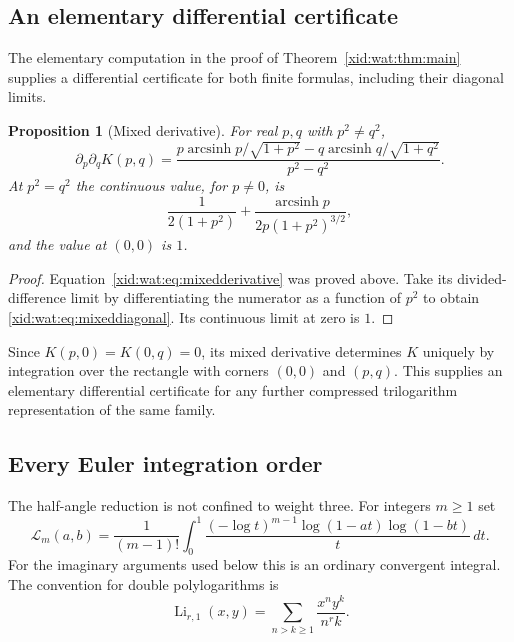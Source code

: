 \documentclass[11pt,a4paper]{article}
\numberwithin{equation}{section}
\newtheorem{proposition}[theorem]{Proposition}
\theoremstyle{definition}
\theoremstyle{remark}
\begin{document}
\subsection{An elementary differential certificate}

The elementary computation in the proof of
Theorem~\ref{xid:wat:thm:main} supplies a differential certificate for
both finite formulas, including their diagonal limits.

\begin{proposition}[Mixed derivative]
\label{xid:wat:prop:derivative}
For real $p,q$ with $p^2\ne q^2$,
\begin{equation}\label{xid:wat:eq:mixedderivative}
 \partial_p\partial_qK(p,q)
 =\frac{p\operatorname{arcsinh}p/\sqrt{1+p^2}
       -q\operatorname{arcsinh}q/\sqrt{1+q^2}}{p^2-q^2}.
\end{equation}
At $p^2=q^2$ the continuous value, for $p\ne0$, is
\begin{equation}\label{xid:wat:eq:mixeddiagonal}
 \frac1{2(1+p^2)}
 +\frac{\operatorname{arcsinh}p}{2p(1+p^2)^{3/2}},
\end{equation}
and the value at $(0,0)$ is $1$.
\end{proposition}

\begin{proof}
Equation~\eqref{xid:wat:eq:mixedderivative} was proved above. Take its
divided-difference limit by differentiating the numerator as a
function of $p^2$ to obtain \eqref{xid:wat:eq:mixeddiagonal}.
Its continuous limit at zero is $1$.
\end{proof}

Since $K(p,0)=K(0,q)=0$, its mixed derivative determines $K$ uniquely
by integration over the rectangle with corners $(0,0)$ and $(p,q)$.
This supplies an elementary differential certificate for any further
compressed trilogarithm representation of the same family.

\subsection{Every Euler integration order}

The half-angle reduction is not confined to weight three. For
integers $m\geq1$ set
\begin{equation}\label{xid:wat:eq:Lm}
 \mathcal L_m(a,b)=\frac1{(m-1)!}\int_0^1
    \frac{(-\log t)^{m-1}\log(1-at)\log(1-bt)}t\,dt.
\end{equation}
For the imaginary arguments used below this is an ordinary convergent
integral. The convention for double polylogarithms is
\[
 \operatorname{Li}_{r,1}(x,y)
 =\sum_{n>k\geq1}\frac{x^ny^k}{n^r k}.
\]
\end{document}
